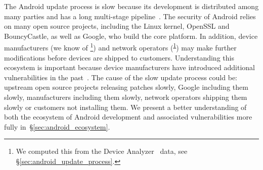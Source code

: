 \documentclass{sig-alternate-2013}
\newcommand{\da}{Device Analyzer}
\newcommand{\dafoot}{\textsuperscript{\ref{foot:dadata}}}
\begin{document}
The Android update process is slow because its development is distributed among many parties and has a long multi-stage pipeline~\cite{HTC2013}.
The security of Android relies on many open source projects, including the Linux kernel, OpenSSL and BouncyCastle, as well as Google, who build the core platform.
In addition, device manufacturers (we know of \daNumManufacturers\footnote{\label{foot:dadata}We computed this from the \da~\cite{Wagner2013} data, see \S\ref{sec:android_update_process}.}) and network operators (\daNumOperators\dafoot) may make further modifications before devices are shipped to customers.
Understanding this ecosystem is important because device manufacturers have introduced additional vulnerabilities in the past~\cite{Grace2012}.
The cause of the slow update process could be: upstream open source projects releasing patches slowly, Google including them slowly, manufacturers including them slowly, network operators shipping them slowly or customers not installing them.
We present a better understanding of both the ecosystem of Android development and associated vulnerabilities more fully in~\S\ref{sec:android_ecosystem}.
\end{document}
